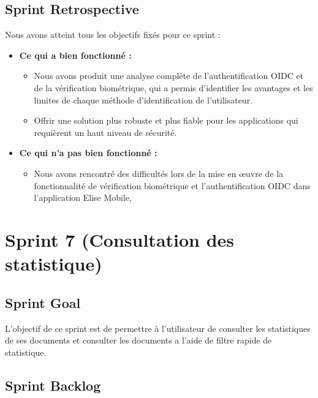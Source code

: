 \subsection{Sprint Retrospective}
Nous avons atteint tous les objectifs fixés pour ce sprint :
\begin{itemize}
  \item \textbf{Ce qui a bien fonctionné :}
  \begin{itemize}
    \item Nous avons produit une analyse complète de l'authentification OIDC et de la vérification biométrique, qui a permis d'identifier les avantages et les limites de chaque méthode d'identification de l'utilisateur.
    \item Offrir une solution plus robuste et plus fiable pour les applications qui requièrent un haut niveau de sécurité.
    
  \end{itemize}

    \item \textbf{Ce qui n'a pas bien fonctionné :}
    \begin{itemize}
      \item Nous avons rencontré des difficultés lors de la mise en œuvre de la fonctionnalité de vérification biométrique et l’authentification OIDC dans l'application Elise Mobile,
    \end{itemize}
      
\end{itemize}
\section{Sprint 7 (Consultation des statistique)}

\subsection{Sprint Goal}
L'objectif de ce sprint est de permettre à l'utilisateur de consulter les statistiques de ses documents et consulter les documents a l'aide de filtre rapide de statistique.

\subsection{Sprint Backlog}


